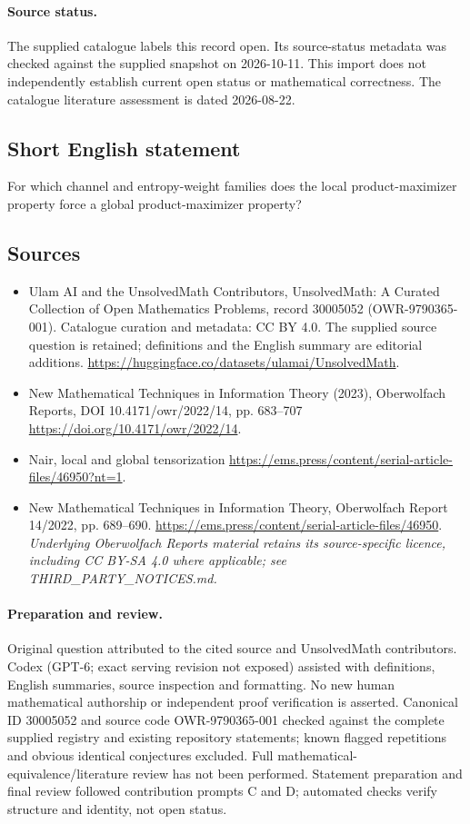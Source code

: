 \documentclass[11pt]{article}
\begin{document}
\paragraph{Source status.}
The supplied catalogue labels this record open. Its source-status metadata was checked against the supplied snapshot on 2026-10-11. This import does not independently establish current open status or mathematical correctness. The catalogue literature assessment is dated 2026-08-22.
\subsection{Short English statement}
For which channel and entropy-weight families does the local product-maximizer property force a global product-maximizer property?
\subsection{Sources}
\begin{itemize}
\item[\hypertarget{source:30005052:1}{S1}] Ulam AI and the UnsolvedMath Contributors, UnsolvedMath: A Curated Collection of Open Mathematics Problems, record 30005052 (OWR-9790365-001). Catalogue curation and metadata: CC BY 4.0. The supplied source question is retained; definitions and the English summary are editorial additions.
\url{https://huggingface.co/datasets/ulamai/UnsolvedMath}.
\item[\hypertarget{source:30005052:2}{S2}] New Mathematical Techniques in Information Theory (2023), Oberwolfach Reports, DOI 10.4171/owr/2022/14, pp. 683--707
\url{https://doi.org/10.4171/owr/2022/14}.
\item[\hypertarget{source:30005052:3}{S3}] Nair, local and global tensorization
\url{https://ems.press/content/serial-article-files/46950?nt=1}.
\item[\hypertarget{source:30005052:4}{S4}] New Mathematical Techniques in Information Theory, Oberwolfach Report 14/2022, pp. 689--690.
\url{https://ems.press/content/serial-article-files/46950}.
\textit{Underlying Oberwolfach Reports material retains its source-specific licence, including CC BY-SA 4.0 where applicable; see THIRD\_PARTY\_NOTICES.md.}
\end{itemize}
\paragraph{Preparation and review.}
Original question attributed to the cited source and UnsolvedMath contributors. Codex (GPT-6; exact serving revision not exposed) assisted with definitions, English summaries, source inspection and formatting. No new human mathematical authorship or independent proof verification is asserted. Canonical ID 30005052 and source code OWR-9790365-001 checked against the complete supplied registry and existing repository statements; known flagged repetitions and obvious identical conjectures excluded. Full mathematical-equivalence/literature review has not been performed. Statement preparation and final review followed contribution prompts C and D; automated checks verify structure and identity, not open status.
\label{end:30005052}
\end{document}
